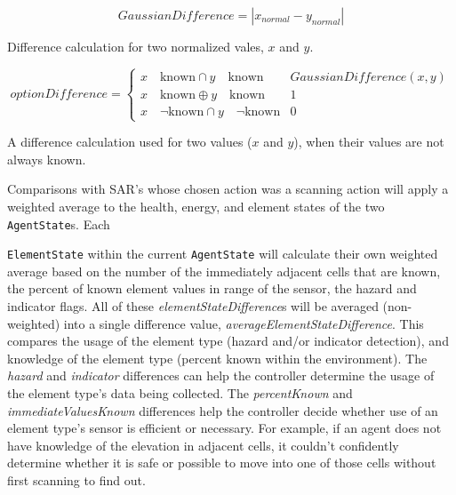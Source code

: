 \begin{capeq}
\begin{equation} \label{eq:gaussian_difference}
  GaussianDifference = |x_{normal} - y_{normal}|
\end{equation}
\caption[Gaussian Difference]{Difference calculation for two normalized vales, $x$ and $y$.}
\end{capeq}

\begin{capeq}
\begin{equation} \label{eq:option_difference}
  optionDifference =
  \begin{cases}
    x \quad \text{known} \cap y \quad \text{known} & GaussianDifference(x,y) \\
    x \quad \text{known} \oplus y \quad \text{known} & 1 \\
    x \quad \neg \text{known} \cap y \quad \neg \text{known} & 0
  \end{cases}
\end{equation}
\caption[Option Difference]{A difference calculation used for two values ($x$ and $y$), when their values are not always known.}
\end{capeq}

Comparisons with SAR's whose chosen action was a scanning action will apply a weighted average to the health, energy, and element states of the two \texttt{AgentState}s.
Each

\noindent
\texttt{ElementState} within the current \texttt{AgentState} will calculate their own weighted average based on the number of the immediately adjacent cells that are known, the percent of known element values in range of the sensor, the hazard and indicator flags.
All of these \textit{elementStateDifference}s will be averaged (non-weighted) into a single difference value, \textit{averageElementStateDifference}.
This compares the usage of the element type (hazard and/or indicator detection), and knowledge of the element type (percent known within the environment).
The \textit{hazard} and \textit{indicator} differences can help the controller determine the usage of the element type's data being collected.
The \textit{percentKnown} and \textit{immediateValuesKnown} differences help the controller decide whether use of an element type's sensor is efficient or necessary.
For example, if an agent does not have knowledge of the elevation in adjacent cells, it couldn't confidently determine whether it is safe or possible to move into one of those cells without first scanning to find out.

